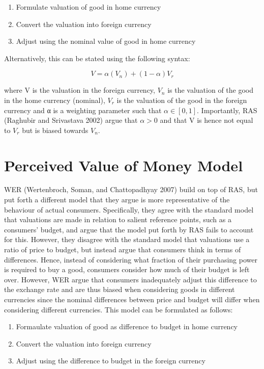 \documentclass[
]{report}
\providecommand{\tightlist}{%
  \setlength{\itemsep}{0pt}\setlength{\parskip}{0pt}}\usepackage{longtable,booktabs,array}
\begin{document}
\begin{enumerate}
\def\labelenumi{\arabic{enumi}.}
\tightlist
\item
  Formulate valuation of good in home currency
\item
  Convert the valuation into foreign currency
\item
  Adjust using the nominal value of good in home currency
\end{enumerate}

Alternatively, this can be stated using the following syntax:

\[V = α(V_n) + (1 - α)V_r\]

where V is the valuation in the foreign currency, \(V_n\) is the
valuation of the good in the home currency (nominal), \(V_r\) is the
valuation of the good in the foreign currency and α is a weighting
parameter such that \(α ∈[0,1]\). Importantly, RAS (Raghubir and
Srivastava 2002) argue that \(α > 0\) and that V is hence not equal to
\(V_r\) but is biased towards \(V_n\).

\section{Perceived Value of Money
Model}\label{perceived-value-of-money-model}

WER (Wertenbroch, Soman, and Chattopadhyay 2007) build on top of RAS,
but put forth a different model that they argue is more representative
of the behaviour of actual consumers. Specifically, they agree with the
standard model that valuations are made in relation to salient reference
points, such as a consumers' budget, and argue that the model put forth
by RAS fails to account for this. However, they disagree with the
standard model that valuations use a ratio of price to budget, but
instead argue that consumers think in terms of differences. Hence,
instead of considering what fraction of their purchasing power is
required to buy a good, consumers consider how much of their budget is
left over. However, WER argue that consumers inadequately adjust this
difference to the exchange rate and are thus biased when considering
goods in different currencies since the nominal differences between
price and budget will differ when considering different currencies. This
model can be formulated as follows:

\begin{enumerate}
\def\labelenumi{\arabic{enumi}.}
\tightlist
\item
  Formaulate valuation of good as difference to budget in home currency
\item
  Convert the valuation into foreign currency
\item
  Adjust using the difference to budget in the foreign currency
\end{enumerate}
\end{document}
